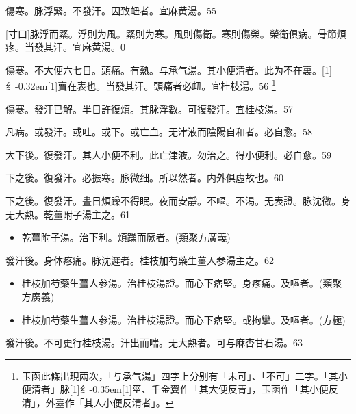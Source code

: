 \documentclass[oneside,b4paper]{ctexbook}
\begin{document}
\begin{flushleft}
傷寒。脉浮緊。不發汗。因致衄者。宜麻黄湯。55

[寸口]脉浮而緊。浮則为風。緊則为寒。風則傷衛。寒則傷榮。榮衛俱病。骨節煩疼。当發其汗。宜麻黄湯。0

傷寒。不大便六七日。頭痛。有熱。与承气湯。其小便清者。此为不在裏。{\hbox{\scalebox{0.6}[1]{纟}\kern-0.32em\scalebox{0.7}[1]{賣}}}在表也。当發其汗。頭痛者必衄。宜桂枝湯。56
\footnote{玉函此條出現兩次，「与承气湯」四字上分别有「未可」、「不可」二字。「其小便清者」脉{\hbox{\scalebox{0.68}[1]{纟}\kern-0.35em\scalebox{0.64}[1]{巠}}}、千金翼作「其大便反青」，玉函作「其小便反清」，外臺作「其人小便反清者」。}

傷寒。發汗已解。半日許復煩。其脉浮數。可復發汗。宜桂枝湯。57

凡病。或發汗。或吐。或下。或亡血。无津液而陰陽自和者。必自愈。58

大下後。復發汗。其人小便不利。此亡津液。勿治之。得小便利。必自愈。59

下之後。復發汗。必振寒。脉微细。所以然者。内外俱虛故也。60

下之後。復發汗。晝日煩躁不得眠。夜而安靜。不嘔。不渴。无表證。脉沈微。身无大熱。乾薑附子湯主之。61

\begin{itemize}
\item 乾薑附子湯。治下利。煩躁而厥者。(類聚方廣義)
\end{itemize}

發汗後。身体疼痛。脉沈遲者。桂枝加芍藥生薑人参湯主之。62

\begin{itemize}
\item 桂枝加芍藥生薑人参湯。治桂枝湯證。而心下痞堅。身疼痛。及嘔者。(類聚方廣義)
\item 桂枝加芍藥生薑人参湯。治桂枝湯證。而心下痞堅。或拘攣。及嘔者。(方極)
\end{itemize}

發汗後。不可更行桂枝湯。汗出而喘。无大熱者。可与麻杏甘石湯。63


\end{flushleft}
\end{document}
